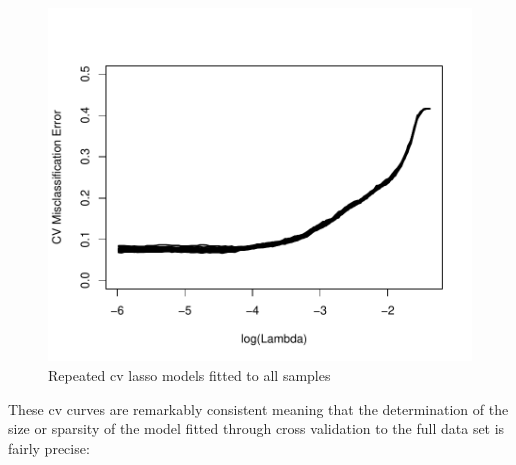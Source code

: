 \documentclass[
]{book}
\begin{document}
\begin{figure}
\centering
\includegraphics{Static/figures/hcc5hmC-glmnetSuite-plot-lassoAll-1.pdf}
\caption{\label{fig:hcc5hmC-glmnetSuite-plot-lassoAll}Repeated cv lasso models fitted to all samples}
\end{figure}

These cv curves are remarkably consistent meaning that the determination of the size or sparsity
of the model fitted through cross validation to the full data set is fairly precise:
\end{document}
